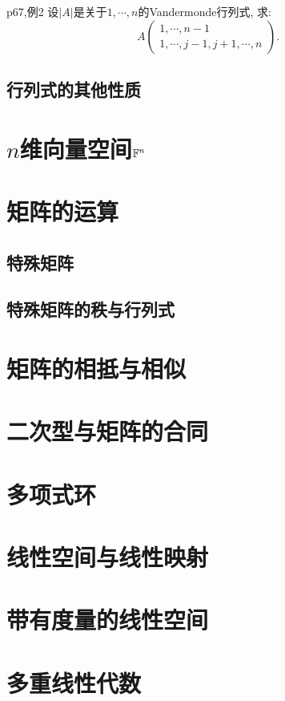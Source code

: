 \begin{example}{p67,例2}
	设$|A|$是关于$1,\cdots ,n$的Vandermonde行列式, 求: $$A \begin{pmatrix}
		1,\cdots ,n-1 \\ 1,\cdots ,j-1,j+1,\cdots ,n
	\end{pmatrix}.$$
\end{example}

\section{行列式的其他性质}





\chapter{$n$维向量空间$\mathbb{F} ^n$}







\chapter{矩阵的运算}

\section{特殊矩阵}




\section{特殊矩阵的秩与行列式}





\chapter{矩阵的相抵与相似}




\chapter{二次型与矩阵的合同}





\chapter{多项式环}




\chapter{线性空间与线性映射}





\chapter{带有度量的线性空间}




\chapter{多重线性代数}